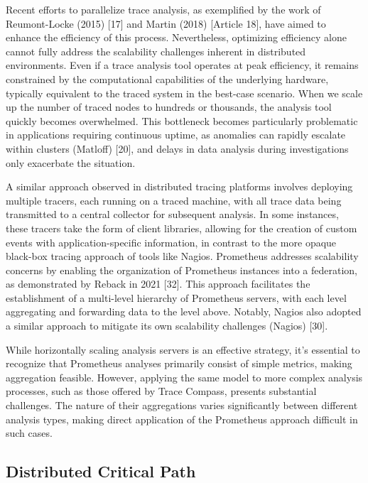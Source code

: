 
Recent efforts to parallelize trace analysis, as exemplified by the work of Reumont-Locke (2015) [17] and Martin (2018) [Article 18], have aimed to enhance the efficiency of this process. Nevertheless, optimizing efficiency alone cannot fully address the scalability challenges inherent in distributed environments. Even if a trace analysis tool operates at peak efficiency, it remains constrained by the computational capabilities of the underlying hardware, typically equivalent to the traced system in the best-case scenario. When we scale up the number of traced nodes to hundreds or thousands, the analysis tool quickly becomes overwhelmed. This bottleneck becomes particularly problematic in applications requiring continuous uptime, as anomalies can rapidly escalate within clusters (Matloff) [20], and delays in data analysis during investigations only exacerbate the situation.

A similar approach observed in distributed tracing platforms involves deploying multiple tracers, each running on a traced machine, with all trace data being transmitted to a central collector for subsequent analysis. In some instances, these tracers take the form of client libraries, allowing for the creation of custom events with application-specific information, in contrast to the more opaque black-box tracing approach of tools like Nagios. Prometheus addresses scalability concerns by enabling the organization of Prometheus instances into a federation, as demonstrated by Reback in 2021 [32]. This approach facilitates the establishment of a multi-level hierarchy of Prometheus servers, with each level aggregating and forwarding data to the level above. Notably, Nagios also adopted a similar approach to mitigate its own scalability challenges (Nagios) [30].

While horizontally scaling analysis servers is an effective strategy, it's essential to recognize that Prometheus analyses primarily consist of simple metrics, making aggregation feasible. However, applying the same model to more complex analysis processes, such as those offered by Trace Compass, presents substantial challenges. The nature of their aggregations varies significantly between different analysis types, making direct application of the Prometheus approach difficult in such cases.

\subsection{Distributed Critical Path}

